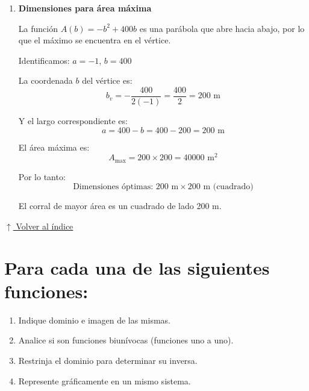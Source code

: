 \documentclass[12pt]{article}
\newcommand{\volverindice}{%
    \vspace{1em}%
    \begin{flushright}%
        \hyperlink{indice}{\small $\uparrow$ Volver al índice}%
    \end{flushright}%
}
\begin{document}
\begin{enumerate}[label=\alph*.-]
\begin{enumerate}[label=\roman*.]
        Despejamos $a$:
        \[2a = 800 - 2b\]
        \[a = 400 - b\]
        
        El área del rectángulo es:
        \[A = a \cdot b\]
        
        Sustituyendo $a = 400 - b$:
        \[A(b) = (400 - b) \cdot b = 400b - b^2\]
        
        Por lo tanto: \[\boxed{A(b) = -b^2 + 400b}\]
        
        \item \textbf{Dimensiones para área máxima}
        
        La función $A(b) = -b^2 + 400b$ es una parábola que abre hacia abajo, por lo que el máximo se encuentra en el vértice.
        
        Identificamos: $a = -1$, $b = 400$
        
        La coordenada $b$ del vértice es:
        \[b_v = -\frac{400}{2(-1)} = \frac{400}{2} = 200 \text{ m}\]
        
        Y el largo correspondiente es:
        \[a = 400 - b = 400 - 200 = 200 \text{ m}\]
        
        El área máxima es:
        \[A_{\max} = 200 \times 200 = 40000 \text{ m}^2\]
        
        Por lo tanto: \[\boxed{\text{Dimensiones óptimas: } 200 \text{ m} \times 200 \text{ m (cuadrado)}}\]
        
        El corral de mayor área es un cuadrado de lado 200 m.
    \end{enumerate}
\end{enumerate}
 
\volverindice

\section[Análisis de funciones]{Para cada una de las siguientes funciones:}

\begin{enumerate}[label=\roman*.]
    \item Indique dominio e imagen de las mismas.
    \item Analice si son funciones biunívocas (funciones uno a uno).
    \item Restrinja el dominio para determinar su inversa.
    \item Represente gráficamente en un mismo sistema.
\end{enumerate}
\end{document}
